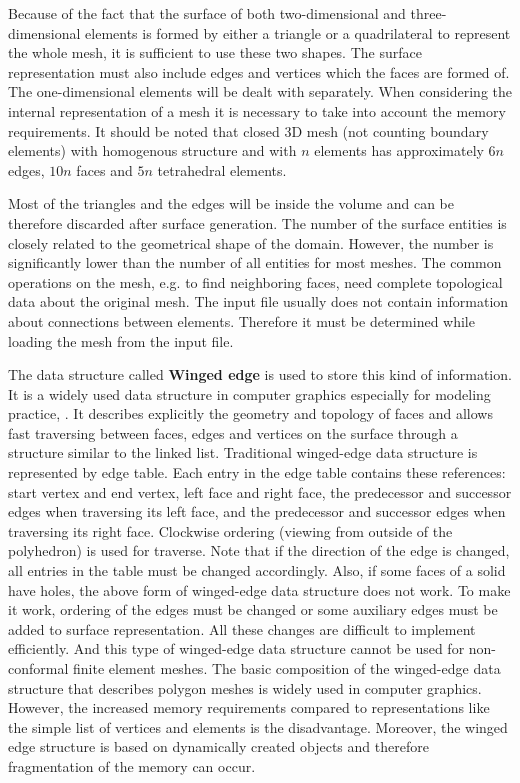 Because of the fact that the surface of both two-dimensional and three-dimensional elements is formed by either a triangle or a quadrilateral to represent the whole mesh, it is sufficient to use these two shapes. The surface representation must also include edges and vertices which the faces are formed of. The one-dimensional elements will be dealt with separately. When considering the internal representation of a mesh it is necessary to take into account the memory requirements. It should be noted that closed 3D mesh (not counting boundary elements) with homogenous structure and with $n$ elements has approximately $6n$ edges, $10n$ faces and $5n$ tetrahedral elements.

Most of the triangles and the edges will be inside the volume and can be therefore discarded after surface generation. The number of the surface entities is closely related to the geometrical shape of the domain. However, the number is significantly lower than the number of all entities for most meshes. The common operations on the mesh, e.g. to find neighboring faces, need complete topological data about the original mesh. The input file usually does not contain information about connections between elements. Therefore it must be determined while loading the mesh from the input file.

The data structure called \textbf{Winged edge} is used to store this kind of information. It is a widely used data structure in computer graphics especially for modeling practice, \cite{XXX-4-6}. It describes explicitly the geometry and topology of faces and allows fast traversing between faces, edges and vertices on the surface through a structure similar to the linked list. Traditional winged-edge data structure is represented by edge table. Each entry in the edge table contains these references: start vertex and end vertex, left face and right face, the predecessor and successor edges when traversing its left face, and the predecessor and successor edges when traversing its right face. Clockwise ordering (viewing from outside of the polyhedron) is used for traverse. Note that if the direction of the edge is changed, all entries in the table must be changed accordingly. Also, if some faces of a solid have holes, the above form of winged-edge data structure does not work. To make it work, ordering of the edges must be changed or some auxiliary edges must be added to surface representation. All these changes are difficult to implement efficiently. And this type of winged-edge data structure cannot be used for non-conformal finite element meshes. The basic composition of the winged-edge data structure that describes polygon meshes is widely used in computer graphics. However, the increased memory requirements compared to representations like the simple list of vertices and elements is the disadvantage. Moreover, the winged edge structure is based on dynamically created objects and therefore fragmentation of the memory can occur.

